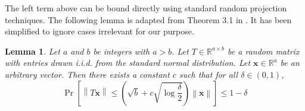 \documentclass[twoside]{article}
\newtheorem{lemma}{Lemma}
\newcommand{\V}{\mathcal{V}}
\newcommand{\x}{\mathbf{x}}
\newcommand{\w}{\theta}
\newcommand{\I}{\mathcal I}
\newcommand{\ltwo}[1]{{\left\lVert {#1} \right\rVert}}
\newcommand{\proj}[1]{\pi_{{#1}}}
\newcommand{\prob}[1]{\Pr\left[{#1}\right]}
\begin{document}
{The left term above can be bound directly using standard random projection techniques.
%
The following lemma is adapted from Theorem 3.1 in \cite{matouvsek2008variants}.
It has been simplified to ignore cases irrelevant for our purpose.
\begin{lemma}
Let $a$ and $b$ be integers with $a>b$.
Let $T\in\mathbb{R}^{a\times b}$ be a random matrix with entries drawn i.i.d. from the standard normal distribution.
Let $\x\in\mathbb{R}^a$ be an arbitrary vector.
Then there exists a constant $c$ such that for all $\delta\in(0,1)$,
\begin{equation*}
\prob{\ltwo{T\x} \le \left(\sqrt{b}+c\sqrt{\log\frac{\delta}{2}}\right)\ltwo\x} \le 1-\delta
\end{equation*}
\end{lemma}
}
\end{document}
